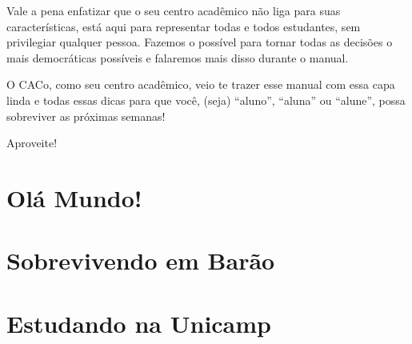 \documentclass[a4paper,10pt,oldfontcommands]{memoir}
\begin{document}
Vale a pena enfatizar que o seu centro acadêmico não liga para suas
características, está aqui para representar todas e todos estudantes, sem
privilegiar qualquer pessoa. Fazemos o possível para tornar todas as decisões
o mais democráticas possíveis e falaremos mais disso durante o manual.

O CACo, como seu centro acadêmico, veio te trazer esse manual com essa capa
linda e todas essas dicas para que você, (seja) ``aluno'', ``aluna'' ou
``alune'', possa sobreviver as próximas semanas!

Aproveite!

\setlength{\parskip}{0em}
\mainmatter
\pagestyle{headings}
\twocolumn
\chapter{Olá Mundo!}


\clearpage


\clearpage


\clearpage



\chapter{Sobrevivendo em Barão}

\newpage

\newpage

\newpage

\newpage


\chapter{Estudando na Unicamp}

\newpage

\newpage

\newpage

\newpage

\newpage

\newpage

\newpage

\newpage

\end{document}
